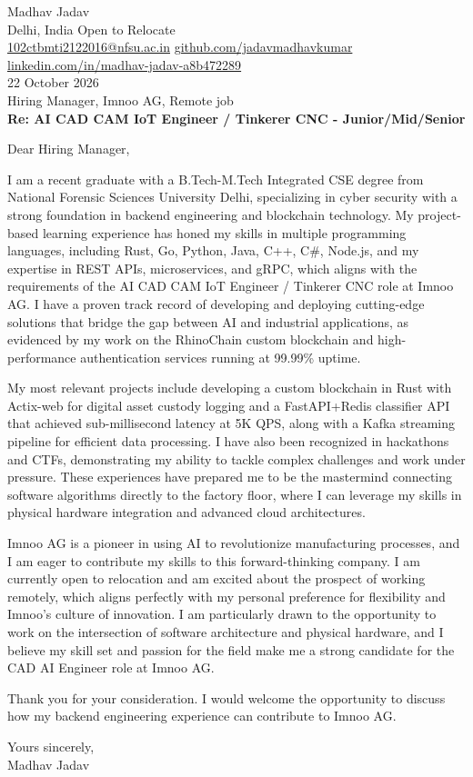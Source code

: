 \documentclass[10pt,letterpaper]{article}
\begin{document}
\begin{flushleft}
Madhav Jadav\\
Delhi, India \textbar{} Open to Relocate\\
\href{mailto:102ctbmti2122016@nfsu.ac.in}{102ctbmti2122016@nfsu.ac.in} \textbar{} \href{https://github.com/jadavmadhavkumar}{github.com/jadavmadhavkumar} \textbar{} \href{https://www.linkedin.com/in/madhav-jadav-a8b472289}{linkedin.com/in/madhav-jadav-a8b472289}\\[8pt]
22 October 2026\\[4pt]
Hiring Manager, Imnoo AG, Remote job\\[8pt]
\textbf{Re: AI CAD CAM IoT Engineer / Tinkerer CNC - Junior/Mid/Senior}\\[8pt]
\end{flushleft}
Dear Hiring Manager,

I am a recent graduate with a B.Tech-M.Tech Integrated CSE degree from National Forensic Sciences University Delhi, specializing in cyber security with a strong foundation in backend engineering and blockchain technology. My project-based learning experience has honed my skills in multiple programming languages, including Rust, Go, Python, Java, C++, C\#, Node.js, and my expertise in REST APIs, microservices, and gRPC, which aligns with the requirements of the AI CAD CAM IoT Engineer / Tinkerer CNC role at Imnoo AG. I have a proven track record of developing and deploying cutting-edge solutions that bridge the gap between AI and industrial applications, as evidenced by my work on the RhinoChain custom blockchain and high-performance authentication services running at 99.99\% uptime.

My most relevant projects include developing a custom blockchain in Rust with Actix-web for digital asset custody logging and a FastAPI+Redis classifier API that achieved sub-millisecond latency at 5K QPS, along with a Kafka streaming pipeline for efficient data processing. I have also been recognized in hackathons and CTFs, demonstrating my ability to tackle complex challenges and work under pressure. These experiences have prepared me to be the mastermind connecting software algorithms directly to the factory floor, where I can leverage my skills in physical hardware integration and advanced cloud architectures.

Imnoo AG is a pioneer in using AI to revolutionize manufacturing processes, and I am eager to contribute my skills to this forward-thinking company. I am currently open to relocation and am excited about the prospect of working remotely, which aligns perfectly with my personal preference for flexibility and Imnoo's culture of innovation. I am particularly drawn to the opportunity to work on the intersection of software architecture and physical hardware, and I believe my skill set and passion for the field make me a strong candidate for the CAD AI Engineer role at Imnoo AG.

Thank you for your consideration. I would welcome the opportunity to discuss how my backend engineering experience can contribute to Imnoo AG.

Yours sincerely,\\[8pt]
Madhav Jadav
\end{document}
